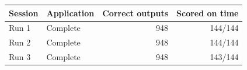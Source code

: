 \begin{table}[H]
\centering
\label{table:sessions:start}
\begin{tabular}{llrr}
\toprule
\textbf{Session} & \textbf{Application} & \textbf{Correct outputs} & \textbf{Scored on time} \\
\midrule
Run 1 & Complete & 948 & 144/144 \\
Run 2 & Complete & 948 & 144/144 \\
Run 3 & Complete & 948 & 143/144 \\
\bottomrule
\end{tabular}
\label{table:sessions:end}
\end{table}
